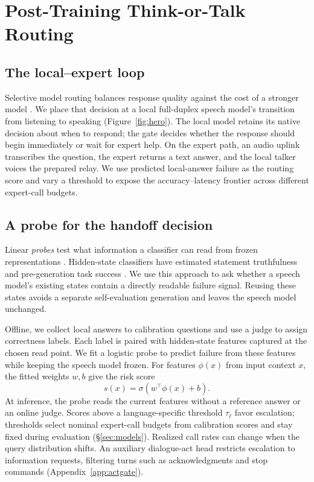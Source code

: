 \section{Post-Training Think-or-Talk Routing}
\label{sec:signal}

\subsection{The local--expert loop}
\label{sec:system}
Selective model routing balances response quality against the cost
of a stronger model \citep{ong2024routellm}. We place that decision at
a local full-duplex speech model's transition from listening to
speaking (Figure~\ref{fig:hero}). The local model retains its native
decision about when to respond; the gate decides whether the response
should begin immediately or wait for expert help. On the expert path,
an audio uplink transcribes the question, the expert returns a text
answer, and the local talker voices the prepared relay. We use predicted
local-answer failure as the routing score and vary a threshold to expose
the accuracy--latency frontier across different expert-call budgets.

\subsection{A probe for the handoff decision}
\label{sec:probe}
Linear \emph{probes} test what information a classifier can read from
frozen representations \citep{alain2016understanding}. Hidden-state
classifiers have estimated statement truthfulness
\citep{azaria2023internal} and pre-generation task success
\citep{lugoloobi2026failures}. We use this approach to ask whether a
speech model's existing states contain a directly readable failure
signal. Reusing these states avoids a separate self-evaluation
generation and leaves the speech model unchanged.

Offline, we collect local answers to calibration questions and use
a judge to assign correctness labels. Each label is paired with
hidden-state features captured at the chosen read point. We fit a
logistic probe to predict failure from these features while keeping
the speech model frozen. For features $\phi(x)$ from input context
$x$, the fitted weights $w,b$ give the risk score
\begin{equation}
 s(x)=\sigma\!\left(w^\top\phi(x)+b\right).
 \label{eq:gate}
\end{equation}
At inference, the probe reads the current features without a
reference answer or an online judge. Scores above a
language-specific threshold $\tau_{\ell}$ favor escalation;
thresholds select nominal expert-call budgets from calibration scores
and stay fixed during evaluation (\S\ref{sec:models}). Realized call
rates can change when the query distribution shifts. An auxiliary dialogue-act head
restricts escalation to information requests, filtering turns such
as acknowledgments and stop commands (Appendix~\ref{app:actgate}).

